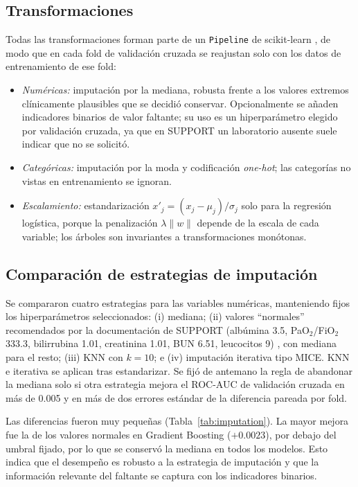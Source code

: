 \documentclass[conference]{IEEEtran}
\begin{document}
\subsection{Transformaciones}
Todas las transformaciones forman parte de un \texttt{Pipeline} de scikit-learn \cite{pedregosa2011}, de modo que en cada fold de validación cruzada se reajustan solo con los datos de entrenamiento de ese fold:
\begin{itemize}
\item \textit{Numéricas:} imputación por la mediana, robusta frente a los valores extremos clínicamente plausibles que se decidió conservar. Opcionalmente se añaden indicadores binarios de valor faltante; su uso es un hiperparámetro elegido por validación cruzada, ya que en SUPPORT un laboratorio ausente suele indicar que no se solicitó.
\item \textit{Categóricas:} imputación por la moda y codificación \textit{one-hot}; las categorías no vistas en entrenamiento se ignoran.
\item \textit{Escalamiento:} estandarización $x'_j=(x_j-\mu_j)/\sigma_j$ solo para la regresión logística, porque la penalización $\lambda\lVert w\rVert$ depende de la escala de cada variable; los árboles son invariantes a transformaciones monótonas.
\end{itemize}

\subsection{Comparación de estrategias de imputación}
Se compararon cuatro estrategias para las variables numéricas, manteniendo fijos los hiperparámetros seleccionados: (i) mediana; (ii) valores ``normales'' recomendados por la documentación de SUPPORT (albúmina 3.5, PaO$_2$/FiO$_2$ 333.3, bilirrubina 1.01, creatinina 1.01, BUN 6.51, leucocitos 9) \cite{supportdata}, con mediana para el resto; (iii) KNN con $k=10$; e (iv) imputación iterativa tipo MICE. KNN e iterativa se aplican tras estandarizar. Se fijó de antemano la regla de abandonar la mediana solo si otra estrategia mejora el ROC-AUC de validación cruzada en más de 0.005 y en más de dos errores estándar de la diferencia pareada por fold.



Las diferencias fueron muy pequeñas (Tabla~\ref{tab:imputation}). La mayor mejora fue la de los valores normales en Gradient Boosting ($+0.0023$), por debajo del umbral fijado, por lo que se conservó la mediana en todos los modelos. Esto indica que el desempeño es robusto a la estrategia de imputación y que la información relevante del faltante se captura con los indicadores binarios.
\end{document}
